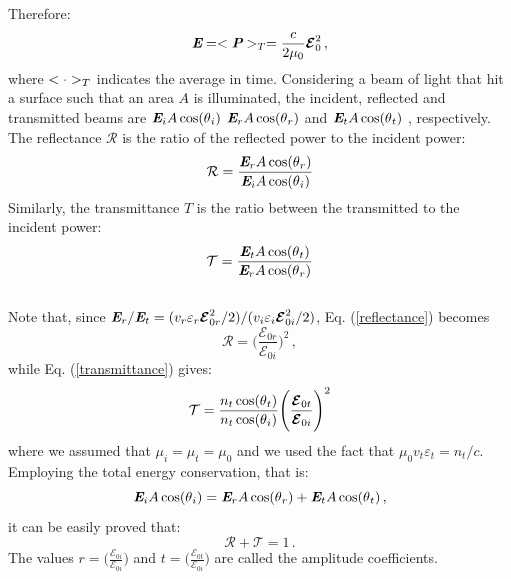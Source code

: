 Therefore:
\begin{equation}
\textit{\textbf{E}} = <\textit{\textbf{P}}>_{T} = \frac{c}{2\mu_0}\boldsymbol{\mathcal{E}}_0^2\,,
\end{equation}
where $<\cdot>_T$ indicates the average in time.
Considering a beam of light that hit a surface such that an area $A$ is illuminated, the incident, reflected and transmitted beams are $\textit{\textbf{E}}_i A\cos(\mbox{$\theta$}_i)$ $\textit{\textbf{E}}_r A\cos(\mbox{$\theta$}_r)$ and $\textit{\textbf{E}}_t A\cos(\mbox{$\theta$}_t)$ , respectively.
The reflectance $\mathcal{R}$ is the ratio of the reflected power to the incident power:
\begin{equation}\label{reflectance}
\mathcal{R} = \frac{\textit{\textbf{E}}_r A\cos(\mbox{$\theta$}_r)}{\textit{\textbf{E}}_i A\cos(\mbox{$\theta$}_i)} 
\end{equation}
Similarly, the transmittance $T$ is the ratio between the transmitted to the incident power:
\begin{equation}\label{transmittance}
\mathcal{T} = \frac{\textit{\textbf{E}}_tA\cos(\mbox{$\theta$}_t)}{\textit{\textbf{E}}_r A\cos(\mbox{$\theta$}_r)}
\end{equation}\\
Note that, since  $\textit{\textbf{E}} _r/\textit{\textbf{E}}_t = (v_r\varepsilon_r \boldsymbol{\mathcal{E}}_{0r}^2/2)/(v_i\varepsilon_i \boldsymbol{\mathcal{E}}_{0i}^2/2)$, Eq. (\ref{reflectance}) becomes
\begin{equation}\label{R}
\mathcal{R} = \Bigg(\frac{\boldsymbol{\mathcal{E}}_{0 r}}{\boldsymbol{\mathcal{E}}_{0 i}}\Bigg)^2\,,
\end{equation} 
while Eq. (\ref{transmittance}) gives: \begin{equation}\label{T}
\mathcal{T} = \frac{n_t \cos(\mbox{$\theta$}_t)}{n_t \cos(\mbox{$\theta$}_i)}\Bigg(\frac{\boldsymbol{\mathcal{E}}_{0 t}}{\boldsymbol{\mathcal{E}}_{0 i}}\Bigg)^2
\end{equation}
where we assumed that $\mu_i = \mu_t  = \mu_0$ and we used the fact that $\mu_0 v_t\varepsilon_t=n_t/c$.
Employing the total energy conservation, that is:
\begin{equation}
\textit{\textbf{E}}_i A\cos(\mbox{$\theta$}_i) = \textit{\textbf{E}}_r A\cos(\mbox{$\theta$}_r)+\textit{\textbf{E}}_t A\cos(\mbox{$\theta$}_t)\,,
\end{equation}
it can be easily proved that:
\begin{equation}
\mathcal{R}+\mathcal{T}=1\,.
\end{equation}
The values $r = \Big(\frac{\boldsymbol{\mathcal{E}}_{0 i}}{\boldsymbol{\mathcal{E}}_{0 i}}\Big)$ and 
$t = \Big(\frac{\boldsymbol{\mathcal{E}}_{0 t}}{\boldsymbol{\mathcal{E}}_{0 i}}\Big)$ are called the amplitude coefficients.  
